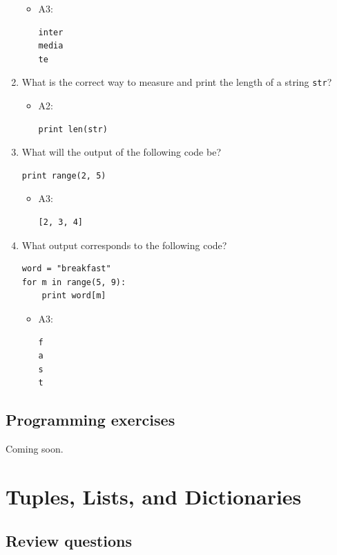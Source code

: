 \documentclass[article,A4,12pt]{llncs}
\begin{document}
\begin{enumerate}
  \begin{itemize}
    \item A3:
\begin{verbatim}
inter
media
te
\end{verbatim}
  \end{itemize}
\item What is the correct way to measure and print the length of a string {\tt str}?
  \begin{itemize}
    \item A2:
\begin{verbatim}
print len(str)
\end{verbatim}
  \end{itemize}
\item What will the output of the following code be?
\begin{verbatim}
print range(2, 5)
\end{verbatim}
  \begin{itemize}
    \item A3:
\begin{verbatim}
[2, 3, 4]
\end{verbatim}
  \end{itemize}
\item What output corresponds to the following code?
\begin{verbatim}
word = "breakfast"
for m in range(5, 9):
    print word[m]
\end{verbatim}
  \begin{itemize}
    \item A3:
\begin{verbatim}
f
a
s
t
\end{verbatim}
  \end{itemize}
\end{enumerate}

\subsection{Programming exercises}

Coming soon.

\section{Tuples, Lists, and Dictionaries}

\subsection{Review questions}
\end{document}
